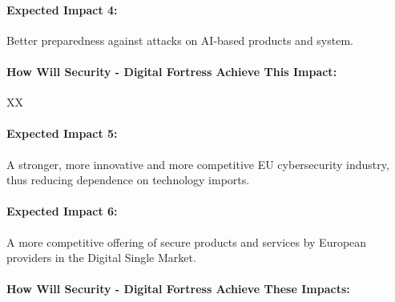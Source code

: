\documentclass[a4paper,11pt]{article}
\newcommand{\project}[1]{\textbf{#1}\xspace}
\newcommand{\SECURITY}{\project{Security - Digital Fortress}}
\newcommand{\TheProject}{\SECURITY}
\begin{document}
\begin{mdframed}[backgroundcolor=blue!5]
\paragraph{Expected Impact 4:}
Better preparedness against attacks on AI-based products and system.
\end{mdframed}

\begin{mdframed}[backgroundcolor=gray!10]
\paragraph{How Will \TheProject{} Achieve This Impact:}
XX
\end{mdframed}

\begin{mdframed}[backgroundcolor=blue!5]
\paragraph{Expected Impact 5:}
A stronger, more innovative and more competitive EU cybersecurity industry, thus reducing dependence on technology imports.

\paragraph{Expected Impact 6:}
A more competitive offering of secure products and services by European providers in the Digital Single Market.

\end{mdframed}

\begin{mdframed}[backgroundcolor=gray!10]
\paragraph{How Will \TheProject{} Achieve These Impacts:}

\end{mdframed}

\end{document}
